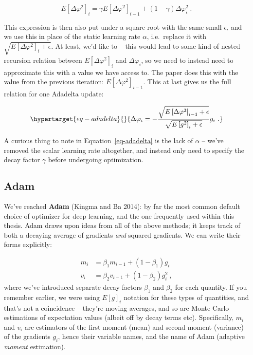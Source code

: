 \documentclass[
  11pt,
  numbers=noendperiod]{book}
\begin{document}
\[
E\left[\Delta \varphi^2\right]_i=\gamma E\left[\Delta \varphi^2\right]_{i-1}+(1-\gamma) \Delta \varphi_i^2 ~.
\]

This expression is then also put under a square root with the same small
\(\epsilon\), and we use this in place of the static learning rate
\(\alpha\), i.e.~replace it with
\(\sqrt{E\left[\Delta \varphi^2\right]_i + \epsilon}\). At least, we'd
like to -- this would lead to some kind of nested recursion relation
between \(E\left[\Delta \varphi^2\right]_i\) and \(\Delta \varphi_i\),
so we need to instead need to approximate this with a value we have
access to. The paper does this with the value from the previous
iteration: \(E\left[\Delta \varphi^2\right]_{i-1}\). This at last gives
us the full relation for one Adadelta update:

\begin{equation}\protect\hypertarget{eq-adadelta}{}{
\Delta \varphi_i = - \frac{\sqrt{E\left[\Delta \varphi^2\right]_{i-1} + \epsilon}}{\sqrt{E\left[g^2\right]_i+ \epsilon}} g_{i} ~.
}\label{eq-adadelta}\end{equation}

A curious thing to note in Equation~\ref{eq-adadelta} is the lack of
\(\alpha\) -- we've removed the scalar learning rate altogether, and
instead only need to specify the decay factor \(\gamma\) before
undergoing optimization.

\hypertarget{adam}{%
\subsection{Adam}\label{adam}}

We've reached \textbf{Adam} (Kingma and Ba 2014): by far the most common
default choice of optimizer for deep learning, and the one frequently
used within this thesis. Adam draws upon ideas from all of the above
methods; it keeps track of both a decaying average of gradients
\emph{and} squared gradients. We can write their forms explicitly:

\[
\begin{aligned}
m_i &=\beta_1 m_{i-1}+\left(1-\beta_1\right) g_i \\
v_i &=\beta_2 v_{i-1}+\left(1-\beta_2\right) g_i^2~,
\end{aligned}
\] where we've introduced separate decay factors \(\beta_1\) and
\(\beta_2\) for each quantity. If you remember earlier, we were using
\(E[g]_i\) notation for these types of quantities, and that's not a
coincidence -- they're moving averages, and so are Monte Carlo
estimations of expectation values (albeit off by decay terms etc).
Specifically, \(m_i\) and \(v_i\) are estimators of the first moment
(mean) and second moment (variance) of the gradients \(g_i\), hence
their variable names, and the name of Adam (adaptive \emph{moment}
estimation).
\end{document}
